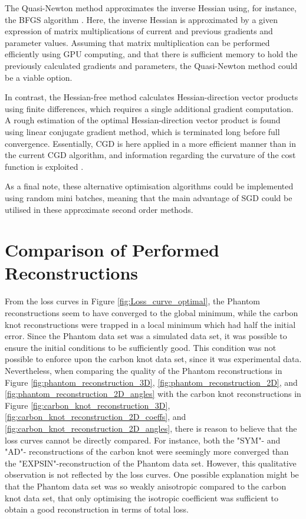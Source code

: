The Quasi-Newton method approximates the inverse Hessian using, for instance, the BFGS algorithm \cite{tan2019review}.
Here, the inverse Hessian is approximated by a given expression of matrix multiplications of current and previous gradients and parameter values.
Assuming that matrix multiplication can be performed efficiently using GPU computing, and that there is sufficient memory to hold the previously calculated gradients and parameters,
the Quasi-Newton method could be a viable option.

In contrast, the Hessian-free method calculates Hessian-direction vector products using finite differences, which requires a single additional gradient computation.
A rough estimation of the optimal Hessian-direction vector product is found using linear conjugate gradient method, which is terminated long before full convergence.
Essentially, CGD is here applied in a more efficient manner than in the current CGD algorithm, and information regarding the curvature of the cost function is exploited \cite{martens2010deep}.

As a final note, these alternative optimisation algorithms could be implemented using random mini batches, meaning that the main advantage of SGD could be utilised in these approximate second order methods.


\section{Comparison of Performed Reconstructions}
\noindent
From the loss curves in Figure \ref{fig:Loss_curve_optimal}, the Phantom reconstructions seem to have converged to the global minimum, while the carbon knot reconstructions
were trapped in a local minimum which had half the initial error.
Since the Phantom data set was a simulated data set, it was possible to ensure the initial conditions to be sufficiently good.
This condition was not possible to enforce upon the carbon knot data set, since it was experimental data.
Nevertheless, when comparing the quality of the Phantom reconstructions in Figure \ref{fig:phantom_reconstruction_3D}, \ref{fig:phantom_reconstruction_2D},
and \ref{fig:phantom_reconstruction_2D_angles} with the carbon knot reconstructions in Figure \ref{fig:carbon_knot_reconstruction_3D}, \ref{fig:carbon_knot_reconstruction_2D_coeffs},
and \ref{fig:carbon_knot_reconstruction_2D_angles}, there is reason to believe that the loss curves cannot be directly compared.
For instance, both the "SYM"- and "AD"- reconstructions of the carbon knot were seemingly more converged than the "EXPSIN"-reconstruction of the Phantom data set.
However, this qualitative observation is not reflected by the loss curves.
One possible explanation might be that the Phantom data set was so weakly anisotropic compared to the carbon knot data set,
that only optimising the isotropic coefficient was sufficient to obtain a good reconstruction in terms of total loss.

